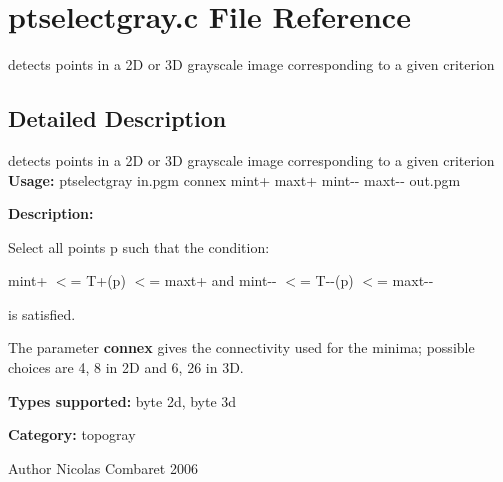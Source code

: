 \section{ptselectgray.c File Reference}
\label{ptselectgray_8c}


detects points in a 2D or 3D grayscale image corresponding to a given criterion  




\subsection{Detailed Description}
detects points in a 2D or 3D grayscale image corresponding to a given criterion {\bfseries Usage:} ptselectgray in.pgm connex mint+ maxt+ mint-\/-\/ maxt-\/-\/ out.pgm

{\bfseries Description:}

Select all points p such that the condition:\par
 mint+ $<$= T+(p) $<$= maxt+ and mint-\/-\/ $<$= T-\/-\/(p) $<$= maxt-\/-\/\par
 is satisfied.\par


The parameter {\bfseries connex} gives the connectivity used for the minima; possible choices are 4, 8 in 2D and 6, 26 in 3D.

{\bfseries Types supported:} byte 2d, byte 3d

{\bfseries Category:} topogray

\begin{DoxyAuthor}{Author}
Nicolas Combaret 2006 
\end{DoxyAuthor}
